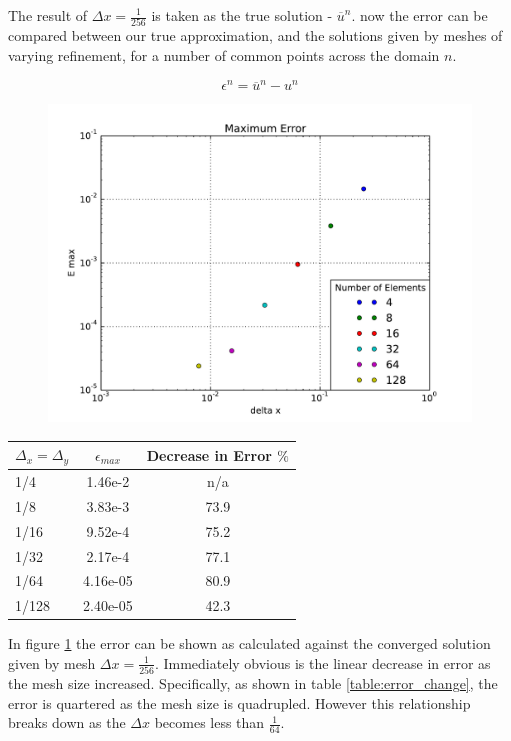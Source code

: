 \documentclass[10pt, a4paper]{article}
\begin{document}
The result of $\Delta x = \frac{1}{256}$ is taken as the true solution - $\overline{u}^n$. now the error can be compared between our true approximation, and the solutions given by meshes of varying refinement, for a number of common points across the domain $n$.

\begin{equation}
\epsilon^n = \overline{u}^n - u^n
\end{equation}

\begin{figure}[htb!]
\centering
    \includegraphics[width=.75\linewidth, clip=true, trim = 0cm 0cm 0cm 0cm]{error}
    \label{fig:error}
\end{figure}

\begin{center}
\begin{tabular}{| l || c | c |}
  \hline
  $\Delta_x = \Delta_y$ & $\epsilon_{max}$ & Decrease in Error $\%$ \\ \hline
  1/4 & 1.46e-2 & n/a \\
  1/8 & 3.83e-3 & 73.9 \\
  1/16 & 9.52e-4 & 75.2 \\
  1/32 & 2.17e-4 & 77.1 \\
  1/64 & 4.16e-05 & 80.9 \\
  1/128 & 2.40e-05 & 42.3 \\
  \hline
\end{tabular}
\label{table:error_change}
\end{center}


In figure \ref{fig:error} the error can be shown as calculated against the converged solution given by mesh $\Delta x = \frac{1}{256}$. Immediately obvious is the linear decrease in error as the mesh size increased. Specifically, as shown in table \ref{table:error_change}, the error is quartered as the mesh size is quadrupled. However this relationship breaks down as the $\Delta x$ becomes less than $\frac{1}{64}$.
\end{document}
